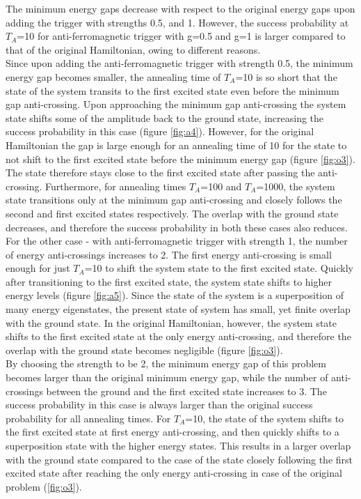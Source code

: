 \documentclass[12]{article}
\begin{document}
The minimum energy gaps decrease with respect to the original energy gaps upon adding the trigger with strengths 0.5, and 1. However, the success probability at $T_A$=10 for anti-ferromagnetic trigger with g=0.5 and g=1 is larger compared to that of the original Hamiltonian, owing to different reasons.\\

Since upon adding the anti-ferromagnetic trigger with strength 0.5, the minimum energy gap becomes smaller, the annealing time of $T_A$=10 is so short that the state of the system transits to the first excited state even before the minimum gap anti-crossing. Upon approaching the minimum gap anti-crossing the system state shifts some of the amplitude back to the ground state, increasing the success probability in this case (figure \ref{fig:a4}). However, for the original Hamiltonian the gap is large enough for an annealing time of 10 for the state to not shift to the first excited state before the minimum energy gap (figure \ref{fig:o3}). The state therefore stays close to the first excited state after passing the anti-crossing.
Furthermore, for annealing times $T_A$=100 and $T_A$=1000, the system state transitions only at the minimum gap anti-crossing and closely follows the second and first excited states respectively. The overlap with the ground state decreases, and therefore the success probability in both these cases also reduces.\\

For the other case - with anti-ferromagnetic trigger with strength 1, the number of energy anti-crossings increases to 2. The first energy anti-crossing is small enough for just $T_A$=10 to shift the system state to the first excited state. Quickly after transitioning to the first excited state, the system state shifts to higher energy levels (figure \ref{fig:a5}). Since the state of the system is a superposition of many energy eigenstates, the present state of system has small, yet finite overlap with the ground state. In the original Hamiltonian, however, the system state shifts to the first excited state at the only energy anti-crossing, and therefore the overlap with the ground state becomes negligible (figure \ref{fig:o3}).\\

By choosing the strength to be 2, the minimum energy gap of this problem becomes larger than the original minimum energy gap, while the number of anti-crossings between the ground and the first excited state increases to 3. The success probability in this case is always larger than the original success probability for all annealing times. For $T_A$=10, the state of the system shifts to the first excited state at first energy anti-crossing, and then quickly shifts to a superposition state with the higher energy states. This results in a larger overlap with the ground state compared to the case of the state closely following the first excited state after reaching the only energy anti-crossing in case of the original problem (\ref{fig:o3}).
\end{document}
